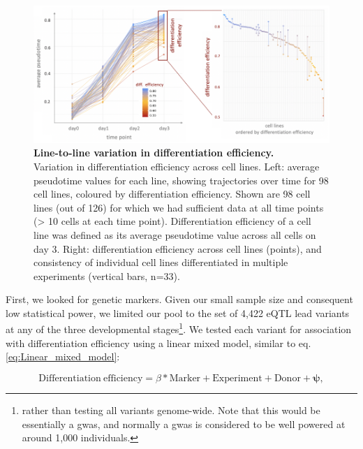 \begin{figure}[h]
\centering
\includegraphics[width=15.5cm]{Chapter4/Fig/endodiff_differentiation_efficiency.png}
\caption[Line-to-line variation in differentiation efficiency]{\textbf{Line-to-line variation in differentiation efficiency.}\\
Variation in differentiation efficiency across cell lines. 
Left: average pseudotime values for each line, showing trajectories over time for 98 cell lines, coloured by differentiation efficiency. 
Shown are 98 cell lines (out of 126) for which we had sufficient data at all time points (> 10 cells at each time point). 
Differentiation efficiency of a cell line was defined as its average pseudotime value across all cells on day 3.
Right: differentiation efficiency across cell lines (points), and consistency of individual cell lines differentiated in multiple experiments (vertical bars, n=33).}
\label{fig:endodiff_differentiation_efficiency}
\end{figure}

First, we looked for genetic markers.
Given our small sample size and consequent low statistical power, we limited our pool to the set of 4,422 eQTL lead variants at any of the three developmental stages\footnote{rather than testing all variants genome-wide. 
Note that this would be essentially a \gls{gwas}, and normally a \gls{gwas} is considered to be well powered at around 1,000 individuals.}.
We tested each variant for association with differentiation efficiency using a linear mixed model, similar to eq. \eqref{eq:Linear_mixed_model}:

\begin{equation}\label{eq:LMM_differentiation_efficiency_prediction}
    \mathrm{Differentiation} \ \mathrm{efficiency} = \beta*\mathrm{Marker} + \mathrm{Experiment} + \mathrm{Donor} + \boldsymbol{\psi},
\end{equation}

